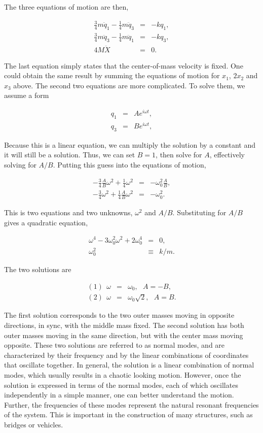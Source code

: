 \documentclass[%
oneside,                 %
final,                   %
10pt]{article}
\begin{document}
The three equations of motion are then,

\begin{eqnarray*}
\frac{3}{4}m\ddot{q}_1-\frac{1}{4}m\ddot{q}_3&=&-kq_1,\\
\frac{3}{4}m\ddot{q}_3-\frac{1}{4}m\ddot{q}_1&=&-kq_3,\\
4M\ddot{X}&=&0.
\end{eqnarray*}

The last equation simply states that the center-of-mass velocity is
fixed. One could obtain the same result by summing the equations of
motion for $x_1$, $2x_2$ and $x_3$ above. The second two equations are
more complicated. To solve them, we assume a form

\begin{eqnarray*}
q_1&=&Ae^{i\omega t},\\
q_3&=&Be^{i\omega t},
\end{eqnarray*}

Because this is a linear equation, we can multiply the solution by a
constant and it will still be a solution. Thus, we can set $B=1$, then
solve for $A$, effectively solving for $A/B$. Putting this guess into
the equations of motion,

\begin{eqnarray*}
-\frac{3}{4}\frac{A}{B}\omega^2+\frac{1}{4}\omega^2&=&-\omega_0^2\frac{A}{B},\\
-\frac{3}{4}\omega^2+\frac{1}{4}\frac{A}{B}\omega^2&=&-\omega_0^2.
\end{eqnarray*}

This is two equations and two unknowns, $\omega^2$ and
$A/B$. Substituting for $A/B$ gives a quadratic equation,

\begin{eqnarray*}
\omega^4-3\omega_0^2\omega^2+2\omega_0^4&=&0,\\
\omega_0^2&\equiv&k/m.
\end{eqnarray*}

The two solutions are

\begin{eqnarray*}
(1)~~\omega&=&\omega_0,~~~A=-B,\\
(2)~~\omega&=&\omega_0\sqrt{2},~~~A=B.
\end{eqnarray*}

The first solution corresponds to the two outer masses moving in
opposite directions, in sync, with the middle mass fixed. The second
solution has both outer masses moving in the same direction, but with
the center mass moving opposite. These two solutions are referred to
as normal modes, and are characterized by their frequency and by the
linear combinations of coordinates that oscillate together. In
general, the solution is a linear combination of normal modes, which
usually results in a chaotic looking motion. However, once the
solution is expressed in terms of the normal modes, each of which
oscillates independently in a simple manner, one can better understand
the motion. Further, the frequencies of these modes represent the
natural resonant frequencies of the system. This is important in the
construction of many structures, such as bridges or vehicles.
\end{document}
